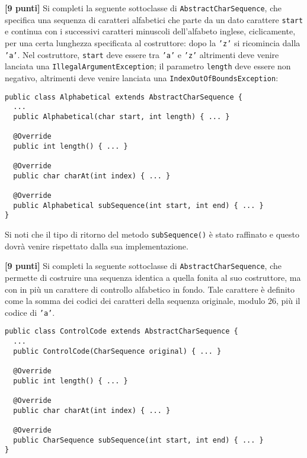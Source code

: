 \documentclass{article}[10pt]
\newcounter{esnu}
\newenvironment{esercizio}{\medskip \noindent {\bf Esercizio\addtocounter{esnu}{1} \arabic{esnu}}}{}
\begin{document}
\begin{esercizio}
\textbf{[9 punti]}
%
Si completi la seguente sottoclasse di \texttt{AbstractCharSequence},
che specifica una sequenza di caratteri alfabetici che parte da un
dato carattere \texttt{start} e continua con i successivi caratteri
minuscoli dell'alfabeto inglese, ciclicamente, per una certa lunghezza
specificata al costruttore: dopo la \texttt{'z'} si ricomincia dalla \texttt{'a'}.
Nel costruttore, \texttt{start} deve essere tra \texttt{'a'} e
\texttt{'z'} altrimenti deve venire lanciata una \texttt{IllegalArgumentException};
il parametro \texttt{length} deve essere non negativo, altrimenti deve
venire lanciata una \texttt{IndexOutOfBoundsException}:

{\small\begin{verbatim}
public class Alphabetical extends AbstractCharSequence {
  ...
  public Alphabetical(char start, int length) { ... }

  @Override
  public int length() { ... }

  @Override
  public char charAt(int index) { ... }

  @Override
  public Alphabetical subSequence(int start, int end) { ... }
}
\end{verbatim}}

\noindent
Si noti che il tipo di ritorno del metodo \texttt{subSequence()} \`e stato raffinato e questo
dovr\`a venire rispettato dalla sua implementazione.
\end{esercizio}

\begin{esercizio}
\textbf{[9 punti]}
Si completi la seguente sottoclasse di \texttt{AbstractCharSequence},
che permette di costruire una sequenza identica a quella fonita al suo
costruttore,
ma con in pi\`u un carattere di controllo alfabetico in fondo. Tale carattere
\`e definito come la somma dei codici dei caratteri della sequenza
originale, modulo $26$, pi\`u il codice di \texttt{'a'}.

{\small
\begin{verbatim}
public class ControlCode extends AbstractCharSequence {
  ...
  public ControlCode(CharSequence original) { ... }

  @Override
  public int length() { ... }

  @Override
  public char charAt(int index) { ... }

  @Override
  public CharSequence subSequence(int start, int end) { ... }
}
\end{verbatim}}

\end{esercizio}
\end{document}
